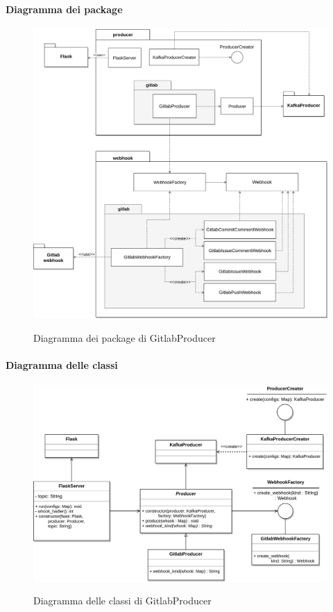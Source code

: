 \paragraph{Diagramma dei package}

\begin{figure}[H]
    \centering
    \includegraphics[width=\textwidth]{img/Package-GitLabProducer.png}\\
    \caption{Diagramma dei package di GitlabProducer}
\end{figure}


\paragraph{Diagramma delle classi}

\begin{figure}[H]
    \centering
    \includegraphics[width=\textwidth]{img/Producers-GitlabProducer.png}\\
    \caption{Diagramma delle classi di GitlabProducer}
\end{figure}

